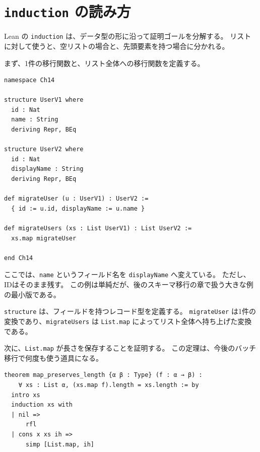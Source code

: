 \section{\texttt{induction} の読み方}

Lean の \texttt{induction} は、データ型の形に沿って証明ゴールを分解する。
リストに対して使うと、空リストの場合と、先頭要素を持つ場合に分かれる。

まず、1件の移行関数と、リスト全体への移行関数を定義する。

\begin{listing}[htbp]
\begin{verbatim}
namespace Ch14

structure UserV1 where
  id : Nat
  name : String
  deriving Repr, BEq

structure UserV2 where
  id : Nat
  displayName : String
  deriving Repr, BEq

def migrateUser (u : UserV1) : UserV2 :=
  { id := u.id, displayName := u.name }

def migrateUsers (xs : List UserV1) : List UserV2 :=
  xs.map migrateUser

end Ch14
\end{verbatim}
\caption{1件の移行とリスト全体の移行}
\label{lst:induction-user-migration}
\end{listing}

ここでは、\texttt{name} というフィールド名を \texttt{displayName} へ変えている。
ただし、IDはそのまま残す。
この例は単純だが、後のスキーマ移行の章で扱う大きな例の最小版である。

\begin{leanbox}
\texttt{structure} は、フィールドを持つレコード型を定義する。
\texttt{migrateUser} は1件の変換であり、\texttt{migrateUsers} は \texttt{List.map} によってリスト全体へ持ち上げた変換である。
\end{leanbox}

次に、\texttt{List.map} が長さを保存することを証明する。
この定理は、今後のバッチ移行で何度も使う道具になる。

\begin{listing}[htbp]
\begin{verbatim}
theorem map_preserves_length {α β : Type} (f : α → β) :
    ∀ xs : List α, (xs.map f).length = xs.length := by
  intro xs
  induction xs with
  | nil =>
      rfl
  | cons x xs ih =>
      simp [List.map, ih]
\end{verbatim}
\caption{List.map は長さを保存する}
\label{lst:induction-map-length}
\end{listing}

